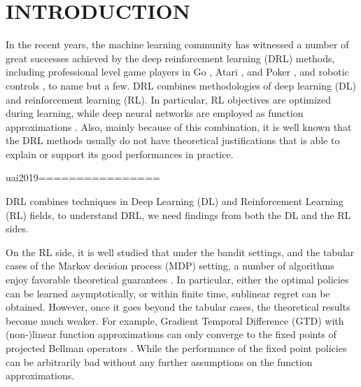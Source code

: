 \section{INTRODUCTION}
\label{sec:introduction}

In the recent years, the machine learning community has witnessed a number of great successes achieved by the deep reinforcement learning (DRL) methods, including professional level game players in Go \citep{silver2016masteringA,silver2017masteringB}, Atari \citep{mnih2015human}, and Poker \citep{moravvcik2017deepstack}, and robotic controls \citep{lillicrap2015continuous,levine2016end}, to name but a few. DRL combines methodologies of deep learning (DL) and reinforcement learning (RL). In particular, RL objectives are optimized during learning, while deep neural networks are employed as function approximations \citep{sutton2018reinforcement}. Also, mainly because of this combination, it is well known that the DRL methods usually do not have theoretical justifications that is able to explain or support its good performances in practice.



uai2019================

DRL combines techniques in Deep Learning (DL) and Reinforcement Learning (RL) fields, to understand DRL, we need findings from both the DL and the RL sides.

On the RL side, it is well studied that under the bandit settings, and the tabular cases of the Markov decision process (MDP) setting, a number of algorithms enjoy favorable theoretical guarantees \citep{bubeck2012regret,sutton2018reinforcement}. In particular, either the optimal policies can be learned asymptotically, or within finite time, sublinear regret can be obtained. However, once it goes beyond the tabular cases, the theoretical results become much weaker. For example, Gradient Temporal Difference (GTD) with (non-)linear function approximations can only converge to the fixed points of projected Bellman operators \citep{sutton2009fast,sutton2009convergent,bhatnagar2009convergent}. While the performance of the fixed point policies can be arbitrarily bad without any further assumptions on the function approximations.


